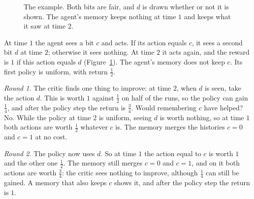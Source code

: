 \documentclass[11pt]{article}
\theoremstyle{definition}
\begin{document}
\begin{figure}[h]
\centering
{}
\caption{The example. Both bits are fair, and $d$ is drawn whether or not it is shown. The agent's memory keeps nothing at time $1$ and keeps what it saw at time $2$.}\label{fig:example}
\end{figure}

At time $1$ the agent sees a bit $c$ and acts. If its action equals $c$, it sees a second bit $d$ at time $2$; otherwise it sees nothing. At time $2$ it acts again, and the reward is $1$ if this action equals $d$ (Figure~\ref{fig:example}). The agent's memory does not keep $c$. Its first policy is uniform, with return $\tfrac12$.

\emph{Round 1.} The critic finds one thing to improve: at time $2$, when $d$ is seen, take the action $d$. This is worth $1$ against $\tfrac12$ on half of the runs, so the policy can gain $\tfrac14$, and after the policy step the return is $\tfrac34$. Would remembering $c$ have helped? No. While the policy at time $2$ is uniform, seeing $d$ is worth nothing, so at time $1$ both actions are worth $\tfrac12$ whatever $c$ is. The memory merges the histories $c=0$ and $c=1$ at no cost.

\emph{Round 2.} The policy now uses $d$. So at time $1$ the action equal to $c$ is worth $1$ and the other one $\tfrac12$. The memory still merges $c=0$ and $c=1$, and on it both actions are worth $\tfrac34$: the critic sees nothing to improve, although $\tfrac14$ can still be gained. A memory that also keeps $c$ shows it, and after the policy step the return is $1$.
\end{document}
